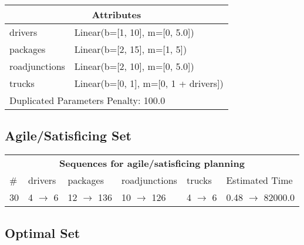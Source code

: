 \documentclass{article}
\begin{document}
                    \begin{center}
                    \begin{tabular}{p{}p{}}
                    \multicolumn{2}{c}{\bf \large Attributes}\\\midrule
                    drivers & Linear(b=[1, 10], m=[0, 5.0])\\
packages & Linear(b=[2, 15], m=[1, 5])\\
roadjunctions & Linear(b=[2, 10], m=[0, 5.0])\\
trucks & Linear(b=[0, 1], m=[0, 1 + drivers])
                    
                     \\\midrule
                    \multicolumn{2}{l}{Duplicated Parameters Penalty: 100.0}
                    \end{tabular}
                    \end{center}
                
                         \subsection*{Agile/Satisficing Set}

                        \begin{center}
                        \begin{tabular}{l|l|l|l|l|l}
                        \multicolumn{6}{c}{\bf \large Sequences for agile/satisficing planning}\\
                        \# & drivers & packages & roadjunctions & trucks & Estimated Time\\\midrule
                        30&4 $\rightarrow$ 6&12 $\rightarrow$ 136&10 $\rightarrow$ 126&4 $\rightarrow$ 6&0.48 $\rightarrow$ 82000.0
                        \end{tabular}
                        \end{center}
                    
                            \subsection*{Optimal Set}
\end{document}
